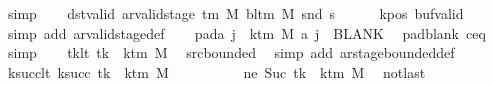 \begin{isabellebody}
\ simp\isanewline
\ \ \isamarkupfalse%
\ dst{\isacharunderscore}{\kern0pt}valid{\isacharcolon}{\kern0pt}\ {\isachardoublequoteopen}ar{\isacharunderscore}{\kern0pt}valid{\isacharunderscore}{\kern0pt}stage\ {\isacharparenleft}{\kern0pt}{\isasymGamma}{\isacharunderscore}{\kern0pt}tm\ M{\isacharparenright}{\kern0pt}\ {\isacharparenleft}{\kern0pt}bl{\isacharunderscore}{\kern0pt}tm\ M{\isacharparenright}{\kern0pt}\ {\isacharparenleft}{\kern0pt}snd\ {\isacharquery}{\kern0pt}s{\isacharprime}{\kern0pt}{\isacharparenright}{\kern0pt}{\isachardoublequoteclose}\isanewline
\ \ \ \ \isamarkupfalse%
\ kpos\ buf{\isacharunderscore}{\kern0pt}valid\ \isamarkupfalse%
\ {\isacharparenleft}{\kern0pt}simp\ add{\isacharcolon}{\kern0pt}\ ar{\isacharunderscore}{\kern0pt}valid{\isacharunderscore}{\kern0pt}stage{\isacharunderscore}{\kern0pt}def{\isacharparenright}{\kern0pt}\isanewline
\ \ \isamarkupfalse%
\ pad{\isacharunderscore}{\kern0pt}a{\isacharcolon}{\kern0pt}\ {\isachardoublequoteopen}{\isasymforall}j\ {\isasymge}\ k{\isacharunderscore}{\kern0pt}tm\ M{\isachardot}{\kern0pt}\ {\isacharquery}{\kern0pt}a\ j\ {\isacharequal}{\kern0pt}\ BLANK{}{\isachardoublequoteclose}\ \isamarkupfalse%
\ pad{\isacharunderscore}{\kern0pt}blank\ c{\isacharprime}{\kern0pt}{\isacharunderscore}{\kern0pt}eq\ \isamarkupfalse%
\ simp\isanewline
\ \ \isamarkupfalse%
\ tk{\isacharunderscore}{\kern0pt}lt{\isacharcolon}{\kern0pt}\ {\isachardoublequoteopen}tk\ {\isacharless}{\kern0pt}\ k{\isacharunderscore}{\kern0pt}tm\ M{\isachardoublequoteclose}\ \isamarkupfalse%
\ src{\isacharunderscore}{\kern0pt}bounded\ \isamarkupfalse%
\ {\isacharparenleft}{\kern0pt}simp\ add{\isacharcolon}{\kern0pt}\ ar{\isacharunderscore}{\kern0pt}stage{\isacharunderscore}{\kern0pt}bounded{\isacharunderscore}{\kern0pt}def{\isacharparenright}{\kern0pt}\isanewline
\ \ \isamarkupfalse%
\ ksucc{\isacharunderscore}{\kern0pt}lt{\isacharcolon}{\kern0pt}\ {\isachardoublequoteopen}k{\isacharunderscore}{\kern0pt}succ\ tk\ {\isacharless}{\kern0pt}\ k{\isacharunderscore}{\kern0pt}tm\ M{\isachardoublequoteclose}\isanewline
\ \ \isamarkupfalse%
\ {\isacharminus}{\kern0pt}\isanewline
\ \ \ \ \isamarkupfalse%
\ ne{\isacharcolon}{\kern0pt}\ {\isachardoublequoteopen}Suc\ tk\ {\isasymnoteq}\ k{\isacharunderscore}{\kern0pt}tm\ M{\isachardoublequoteclose}\ \isamarkupfalse%
\ notlast\ \isamarkupfalse%

\end{isabellebody}
